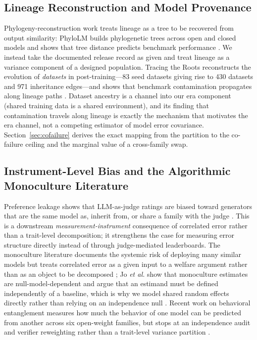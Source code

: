 \documentclass{ieeeaccess}
\theoremstyle{definition}
\theoremstyle{plain}
\begin{document}
\subsection{Lineage Reconstruction and Model Provenance}
Phylogeny-reconstruction work treats lineage as a tree to be recovered from output
similarity: PhyloLM builds phylogenetic trees across open and closed models and
shows that tree distance predicts benchmark performance \cite{phylolm2024}. We
instead take the documented release record as given and treat lineage as a
variance component of a designed population. Tracing the Roots reconstructs the
evolution of \emph{datasets} in post-training---83 seed datasets giving rise to
430 datasets and 971 inheritance edges---and shows that benchmark contamination
propagates along lineage paths \cite{li2026roots}. Dataset ancestry is a channel
into our era component (shared training data is a shared environment), and its
finding that contamination travels along lineage is exactly the mechanism that
motivates the era channel, not a competing estimator of model error covariance.
Section~\ref{sec:cofailure} derives the exact mapping from the partition to the
co-failure ceiling and the marginal value of a cross-family swap.

\subsection{Instrument-Level Bias and the Algorithmic Monoculture Literature}
Preference leakage shows that LLM-as-judge ratings are biased toward generators
that are the same model as, inherit from, or share a family with the judge
\cite{li2026pref}. This is a downstream \emph{measurement-instrument} consequence
of correlated error rather than a trait-level decomposition; it strengthens the
case for measuring error structure directly instead of through judge-mediated
leaderboards. The monoculture literature documents the systemic risk of deploying
many similar models but treats correlated error as a given input to a welfare
argument rather than as an object to be decomposed \cite{monoculture2024,jo2026};
Jo \emph{et al.} show that monoculture estimates are null-model-dependent and
argue that an estimand must be defined independently of a baseline, which is why
we model shared random effects directly rather than relying on an independence
null \cite{jo2026}. Recent work on behavioral entanglement measures how much the
behavior of one model can be predicted from another across six open-weight
families, but stops at an independence audit and verifier reweighting rather than
a trait-level variance partition \cite{kuai2026}.
\end{document}
